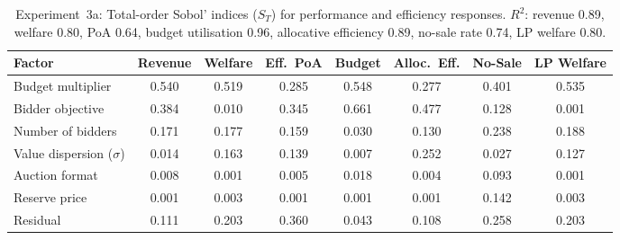 \begin{table}[H]
\centering
\caption{Experiment~3a: Total-order Sobol' indices ($S_T$) for performance and efficiency responses. $R^2$: revenue 0.89, welfare 0.80, PoA 0.64, budget utilisation 0.96, allocative efficiency 0.89, no-sale rate 0.74, LP welfare 0.80.}
\label{tab:sens_exp3a_primary}
\small
\begin{tabular}{l ccccccc}
\toprule
Factor & Revenue & Welfare & Eff.\ PoA & Budget & Alloc.\ Eff. & No-Sale & LP Welfare \\
\midrule
Budget multiplier         & 0.540 & 0.519 & 0.285 & 0.548 & 0.277 & 0.401 & 0.535 \\
Bidder objective          & 0.384 & 0.010 & 0.345 & 0.661 & 0.477 & 0.128 & 0.001 \\
Number of bidders         & 0.171 & 0.177 & 0.159 & 0.030 & 0.130 & 0.238 & 0.188 \\
Value dispersion ($\sigma$) & 0.014 & 0.163 & 0.139 & 0.007 & 0.252 & 0.027 & 0.127 \\
Auction format            & 0.008 & 0.001 & 0.005 & 0.018 & 0.004 & 0.093 & 0.001 \\
Reserve price             & 0.001 & 0.003 & 0.001 & 0.001 & 0.001 & 0.142 & 0.003 \\
\midrule
Residual                  & 0.111 & 0.203 & 0.360 & 0.043 & 0.108 & 0.258 & 0.203 \\
\bottomrule
\end{tabular}
\end{table}

\begin{table}[H]
\centering
\caption{Experiment~3a: Total-order Sobol' indices ($S_T$) for stability and dynamics responses. $R^2$: pacing stability 0.62, entropy 0.87, warm start 0.48, inter-episode volatility 0.28, bid-to-value 0.12, bid suppression 0.12, cross-episode drift 0.12.}
\label{tab:sens_exp3a_secondary}
\small
{}
\end{table}


